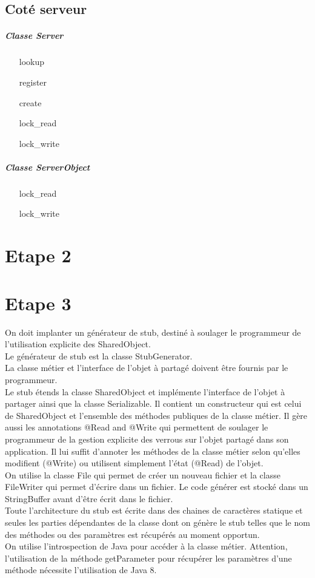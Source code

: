 \documentclass[a4paper,12pt]{article}
\begin{document}
\subsection{Coté serveur}
\subparagraph{Classe Server}
\begin{itemize}
\item[lookup]
\item[register]
\item[create]
\item[lock\_read]
\item[lock\_write]
\end{itemize}

\subparagraph{Classe ServerObject}
\begin{itemize}
\item[lock\_read]
\item[lock\_write]
\end{itemize}


\clearpage
\section{Etape 2}

\clearpage
\section{Etape 3}

\bigskip
\bigskip
\bigskip

On doit  implanter un générateur de stub, destiné à soulager le programmeur de l'utilisation explicite des SharedObject. \\

Le générateur de stub est la classe StubGenerator.\\
La classe métier et l'interface de l'objet à partagé doivent être fournis par le programmeur.\\

Le stub étends la classe SharedObject et implémente l'interface de l'objet à partager ainsi que la classe Serializable.
Il contient un constructeur qui est celui de SharedObject et l'ensemble des méthodes publiques de la classe métier.
Il gère aussi les annotations @Read and @Write qui permettent de soulager le programmeur de la gestion explicite des verrous sur l'objet partagé dans son application. Il lui suffit d'annoter les méthodes de la classe métier selon qu'elles modifient (@Write) ou utilisent simplement l'état (@Read) de l'objet. \\

On utilise la classe File qui permet de créer un nouveau fichier et la classe FileWriter qui permet d'écrire dans un fichier. Le code générer est stocké dans un StringBuffer avant d'être écrit dans le fichier.\\
Toute l'architecture du stub est écrite dans des chaines de caractères statique et seules les parties dépendantes de la classe dont on génère le stub telles que le nom des méthodes ou des paramètres est récupérés au moment opportun.\\
 On utilise l'introspection de Java pour accéder à la classe métier. Attention, l'utilisation de la méthode getParameter pour récupérer les paramètres d'une méthode nécessite l'utilisation de Java 8.\\
\end{document}
